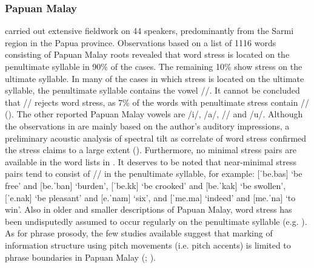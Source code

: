 \subsubsection{Papuan Malay}

    \citet{kluge_grammar_2017} carried out extensive fieldwork on 44 speakers, predominantly from the Sarmi region in the Papua province. Observations based on a list of 1116 words consisting of Papuan Malay roots revealed that word stress is located on the penultimate syllable in 90\% of the cases. The remaining 10\% show stress on the ultimate syllable. In many of the cases in which stress is located on the ultimate syllable, the penultimate syllable contains the vowel //. It cannot be concluded that // rejects word stress, as 7\% of the words with penultimate stress contain // (\citealt[96]{kluge_grammar_2017}). The other reported Papuan Malay vowels are /i/, /a/, // and /u/. Although the observations in \citet{kluge_grammar_2017} are mainly based on the author's auditory impressions, a preliminary acoustic analysis of spectral tilt as correlate of word stress confirmed the stress claims to a large extent (\citealt{kaland_spectral_2018}). Furthermore, no minimal stress pairs are available in the word lists in \citet{kluge_grammar_2017}. It deserves to be noted that near-minimal stress pairs tend to consist of // in the penultimate syllable, for example: [ˈbe.bas] `be free' and [be.ˈban] `burden', [ˈbe.kk] `be crooked' and [be.ˈkak] `be swollen', [ˈe.nak] `be pleasant' and [e.ˈnam] `six', and [ˈme.ma] `indeed' and [me.ˈna] `to win'. Also in older and smaller descriptions of Papuan Malay, word stress has been undisputedly assumed to occur regularly on the penultimate syllable (e.g. \citealt{donohue_papuan_2007}). As for phrase prosody, the few studies available suggest that marking of information structure using pitch movements (i.e. pitch accents) is limited to phrase boundaries in Papuan Malay (\citealt{kaland_repetition_2018}; \citealt{riesberg_perception_2018}).

